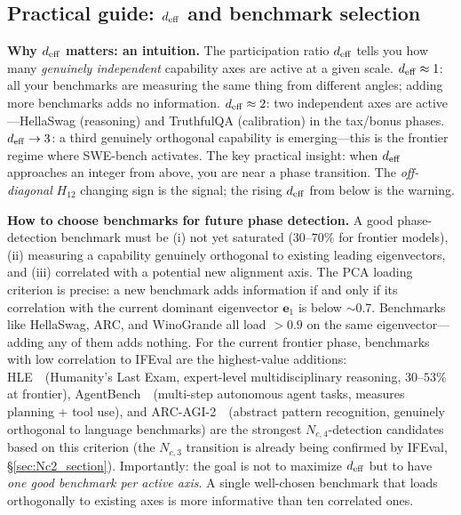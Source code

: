 \documentclass[11pt]{article}
\begin{document}
\subsection{Practical guide: $d_{\rm eff}$ and benchmark selection}

\textbf{Why $d_{\rm eff}$ matters: an intuition.}
The participation ratio $d_{\rm eff}$ tells you how many \emph{genuinely independent} capability axes are active at a given scale.
$d_{\rm eff} \approx 1$: all your benchmarks are measuring the same thing from different angles; adding more benchmarks adds no information.
$d_{\rm eff} \approx 2$: two independent axes are active---HellaSwag (reasoning) and TruthfulQA (calibration) in the tax/bonus phases.
$d_{\rm eff} \to 3$: a third genuinely orthogonal capability is emerging---this is the frontier regime where SWE-bench activates.
The key practical insight: when $d_{\rm eff}$ approaches an integer from above, you are near a phase transition.
The \emph{off-diagonal} $H_{12}$ changing sign is the signal; the rising $d_{\rm eff}$ from below is the warning.

\textbf{How to choose benchmarks for future phase detection.}
A good phase-detection benchmark must be (i) not yet saturated ($30$--$70\%$ for frontier models), (ii) measuring a capability genuinely orthogonal to existing leading eigenvectors, and (iii) correlated with a potential new alignment axis.
The PCA loading criterion is precise: a new benchmark adds information if and only if its correlation with the current dominant eigenvector $\mathbf{e}_1$ is below $\sim$0.7.
Benchmarks like HellaSwag, ARC, and WinoGrande all load $>0.9$ on the same eigenvector---adding any of them adds nothing.
For the current frontier phase, benchmarks with low correlation to IFEval are the highest-value additions:
HLE~\cite{hle2025}~(Humanity's Last Exam, expert-level multidisciplinary reasoning, $30$--$53\%$ at frontier),
AgentBench~\cite{agentbench2023}~(multi-step autonomous agent tasks, measures planning + tool use),
and ARC-AGI-2~\cite{arcagi2}~(abstract pattern recognition, genuinely orthogonal to language benchmarks)
are the strongest $N_{c,4}$-detection candidates based on this criterion (the $N_{c,3}$ transition is already being confirmed by IFEval, \S\ref{sec:Nc2_section}).
Importantly: the goal is not to maximize $d_{\rm eff}$ but to have \emph{one good benchmark per active axis}.
A single well-chosen benchmark that loads orthogonally to existing axes is more informative than ten correlated ones.

\end{document}
